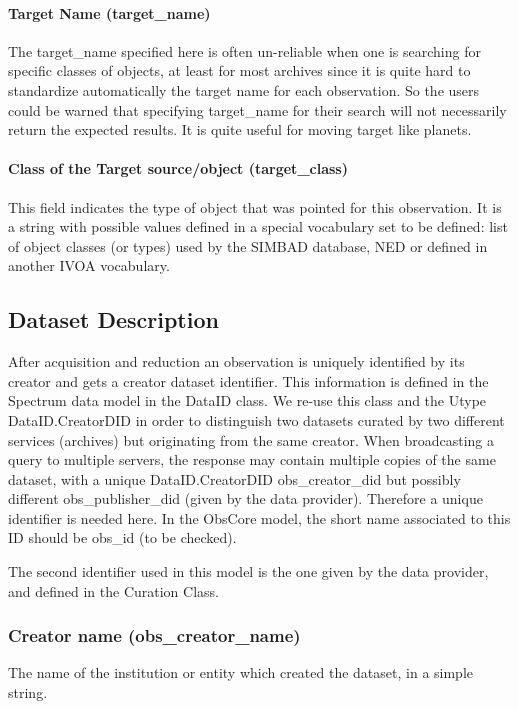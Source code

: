 \documentclass[11pt,a4paper]{ivoa}
\begin{document}
\paragraph{Target Name (target\_name)}
The target\_name specified here is often un-reliable when one is searching for specific classes of objects, at least for
most archives since it is quite hard to standardize automatically the target name for each observation. So the users
could be warned that specifying target\_name for their search will not necessarily return the expected results. It is
quite useful for moving target like planets.

\paragraph{Class of the Target source/object (target\_class)}
This field indicates the type of object that was pointed for this observation. It is a string with possible values
defined in a special vocabulary set to be defined: list of object classes (or types) used by the SIMBAD database, NED
or defined in another IVOA vocabulary. 

\subsection{Dataset Description}
After acquisition and reduction an observation is uniquely identified by its creator and gets a creator dataset
identifier.  This information is defined in the Spectrum data model in the DataID class. We re-use this class and the
Utype DataID.CreatorDID in order to distinguish two datasets curated by two different services (archives) but
originating from the same creator.  When broadcasting a query to multiple servers, the response may contain multiple
copies of the same dataset, with a unique DataID.CreatorDID obs\_creator\_did but possibly different
obs\_publisher\_did (given by the data provider). Therefore a unique identifier is needed here.  In the ObsCore model,
the short name associated to this ID should be obs\_id (to be checked).

The second identifier used in this model is the one given by the data provider, and defined in the Curation Class.

\subsubsection{Creator name (obs\_creator\_name)}
The name of the institution or entity which created the dataset, in a simple string.
\end{document}
